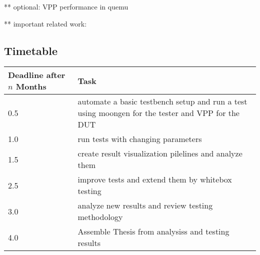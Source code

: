 \documentclass[NET,a4,12pt,ngerman]{netforms}
\begin{document}
** optional: VPP performance in quemu

** important related work: \cite{vppwiki:perfomance} \cite{vppwiki:benchmarks}
\cite{revisiting-benchmarking:1} \cite{openvswitch:gym}

\subsection*{Timetable}

\begin{tabular}{|l|p{10cm}|}
\hline
Deadline after $n$ Months & Task \\ \hline
0.5 & automate a basic testbench setup and run a test using moongen for
the tester and VPP for the DUT \\ \hline
1.0 & run tests with changing parameters \\ \hline
1.5 & create result visualization pilelines and analyze them \\ \hline
2.5 & improve tests and extend them by whitebox testing \\ \hline
3.0 & analyze new results and review testing methodology \\ \hline
4.0 & Assemble Thesis from analysiss and testing results \\ \hline
\end{tabular}



\end{document}
